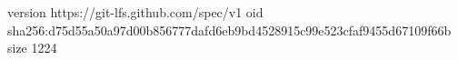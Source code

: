 version https://git-lfs.github.com/spec/v1
oid sha256:d75d55a50a97d00b856777dafd6eb9bd4528915c99e523cfaf9455d67109f66b
size 1224

